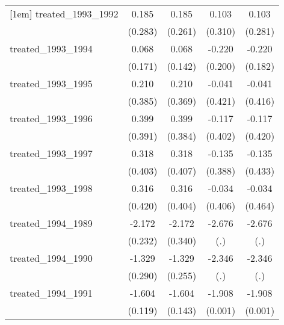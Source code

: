 {\begin{tabular}{l*{4}{c}}
[1em]
treated\_1993\_1992&       0.185         &       0.185         &       0.103         &       0.103         \\
            &     (0.283)         &     (0.261)         &     (0.310)         &     (0.281)         \\
[1em]
treated\_1993\_1994&       0.068         &       0.068         &      -0.220         &      -0.220         \\
            &     (0.171)         &     (0.142)         &     (0.200)         &     (0.182)         \\
[1em]
treated\_1993\_1995&       0.210         &       0.210         &      -0.041         &      -0.041         \\
            &     (0.385)         &     (0.369)         &     (0.421)         &     (0.416)         \\
[1em]
treated\_1993\_1996&       0.399         &       0.399         &      -0.117         &      -0.117         \\
            &     (0.391)         &     (0.384)         &     (0.402)         &     (0.420)         \\
[1em]
treated\_1993\_1997&       0.318         &       0.318         &      -0.135         &      -0.135         \\
            &     (0.403)         &     (0.407)         &     (0.388)         &     (0.433)         \\
[1em]
treated\_1993\_1998&       0.316         &       0.316         &      -0.034         &      -0.034         \\
            &     (0.420)         &     (0.404)         &     (0.406)         &     (0.464)         \\
[1em]
treated\_1994\_1989&      -2.172\sym{***}&      -2.172\sym{***}&      -2.676         &      -2.676         \\
            &     (0.232)         &     (0.340)         &         (.)         &         (.)         \\
[1em]
treated\_1994\_1990&      -1.329\sym{***}&      -1.329\sym{***}&      -2.346         &      -2.346         \\
            &     (0.290)         &     (0.255)         &         (.)         &         (.)         \\
[1em]
treated\_1994\_1991&      -1.604\sym{***}&      -1.604\sym{***}&      -1.908\sym{***}&      -1.908\sym{***}\\
            &     (0.119)         &     (0.143)         &     (0.001)         &     (0.001)         \\

\end{tabular}}
